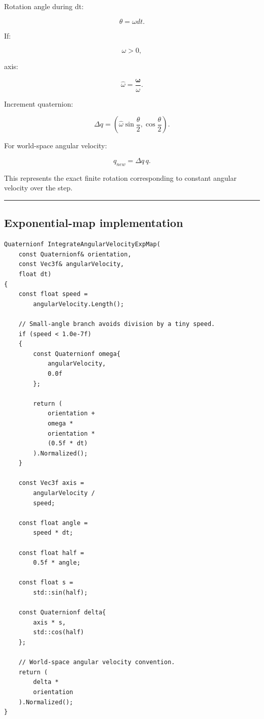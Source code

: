 Rotation angle during dt:

\[
\theta
=
\omega dt.
\]

If:

\[
\omega>0,
\]

axis:

\[
\hat\omega
=
\frac{\boldsymbol\omega}{\omega}.
\]

Increment quaternion:

\[
\boxed{
\Delta q
=
\left(
\hat\omega
\sin\frac{\theta}{2},
\cos\frac{\theta}{2}
\right).
}
\]

For world-space angular velocity:

\[
\boxed{
q_{new}
=
\Delta q\,q.
}
\]

This represents the exact finite rotation corresponding to constant angular velocity over the step.

\begin{center}\rule{0.5\linewidth}{0.5pt}\end{center}

\subsection{Exponential-map implementation}\label{06-engine-ii-ch037-exponential-map-implementation}

\hypertarget{06-engine-ii-ch037-exponential-map-implementation}{}

\begin{verbatim}
Quaternionf IntegrateAngularVelocityExpMap(
    const Quaternionf& orientation,
    const Vec3f& angularVelocity,
    float dt)
{
    const float speed =
        angularVelocity.Length();

    // Small-angle branch avoids division by a tiny speed.
    if (speed < 1.0e-7f)
    {
        const Quaternionf omega{
            angularVelocity,
            0.0f
        };

        return (
            orientation +
            omega *
            orientation *
            (0.5f * dt)
        ).Normalized();
    }

    const Vec3f axis =
        angularVelocity /
        speed;

    const float angle =
        speed * dt;

    const float half =
        0.5f * angle;

    const float s =
        std::sin(half);

    const Quaternionf delta{
        axis * s,
        std::cos(half)
    };

    // World-space angular velocity convention.
    return (
        delta *
        orientation
    ).Normalized();
}
\end{verbatim}

